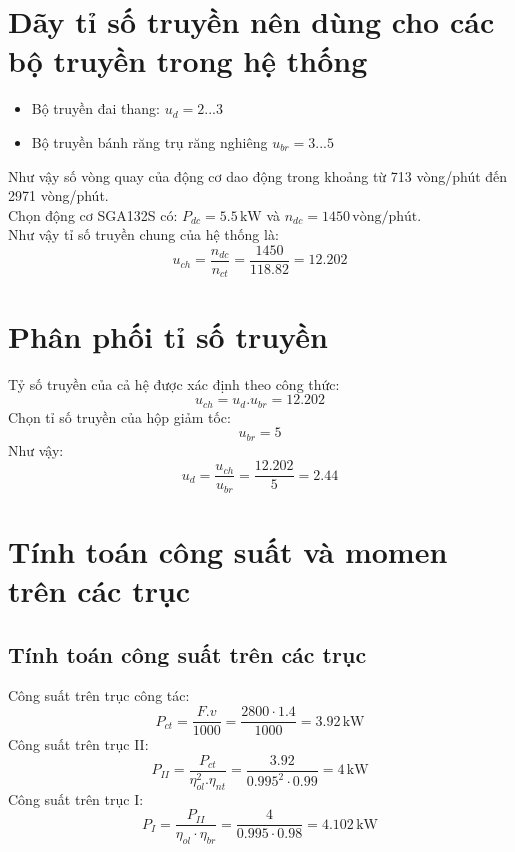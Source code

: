 \section{Dãy tỉ số truyền nên dùng cho các bộ truyền trong hệ thống}
\begin{itemize}
    \item Bộ truyền đai thang: $u_{d} = 2...3$
    \item Bộ truyền bánh răng trụ răng nghiêng $u_{br} = 3...5$
\end{itemize}
Như vậy số vòng quay của động cơ dao động trong khoảng từ 713 vòng/phút đến 2971 vòng/phút.\\
Chọn động cơ SGA132S có: $P_{dc} = 5.5 \, \text{kW}$ và $n_{dc} = 1450 \, \text{vòng/phút}$. \\
Như vậy tỉ số truyền chung của hệ thống là:
\begin{equation}
    u_{ch} = \frac{n_{dc}}{n_{ct}} = \frac{1450}{118.82} = 12.202
\end{equation}

\section{Phân phối tỉ số truyền}
Tỷ số truyền của cả hệ được xác định theo công thức:
\begin{equation}
    u_{ch} = u_d.u_{br} = 12.202
\end{equation}
Chọn tỉ số truyền của hộp giảm tốc:
\begin{equation}
    u_{br} = 5
\end{equation}
Như vậy:
\begin{equation}
    u_d = \frac{u_{ch}}{u_{br}} = \frac{12.202}{5} = 2.44
\end{equation}

\section{Tính toán công suất và momen trên các trục}
\subsection{Tính toán công suất trên các trục}
Công suất trên trục công tác:
\begin{equation}
    P_{ct} = \frac{F.v}{1000} = \frac{2800 \cdot 1.4}{1000} = 3.92 \, \text{kW}
\end{equation}
Công suất trên trục II:
\begin{equation}
    P_{II} = \frac{P_{ct}}{\eta_{ol}^2.\eta_{nt}} = \frac{3.92}{0.995^2 \cdot 0.99} = 4 \, \text{kW}
\end{equation}
Công suất trên trục I:
\begin{equation}
    P_{I} = \frac{P_{II}}{\eta_{ol} \cdot \eta_{br}} = \frac{4}{0.995 \cdot 0.98} = 4.102 \, \text{kW}
\end{equation}

